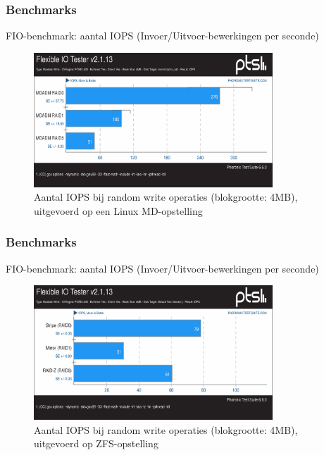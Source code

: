 \documentclass{beamer}
\begin{document}


\begin{frame}
  \frametitle{Benchmarks}
  FIO-benchmark: aantal IOPS (Invoer/Uitvoer-bewerkingen per seconde)    
  \begin{figure}
    \centering
    \includegraphics[width=0.8\textwidth]{img/Testen/FIO-4MB/fio-randomwrite-4mb-md}
    \caption{Aantal IOPS bij random write operaties (blokgrootte: 4MB), uitgevoerd op een Linux MD-opstelling}
  \end{figure}
\end{frame}


\begin{frame}
  \frametitle{Benchmarks}
  FIO-benchmark: aantal IOPS (Invoer/Uitvoer-bewerkingen per seconde)    
  \begin{figure}
    \centering
    \includegraphics[width=0.8\textwidth]{img/Testen/FIO-4MB/fio-randomwrite-4mb-zfs}
    \caption{Aantal IOPS bij random write operaties (blokgrootte: 4MB), uitgevoerd op ZFS-opstelling}
  \end{figure}
\end{frame}

\end{document}
